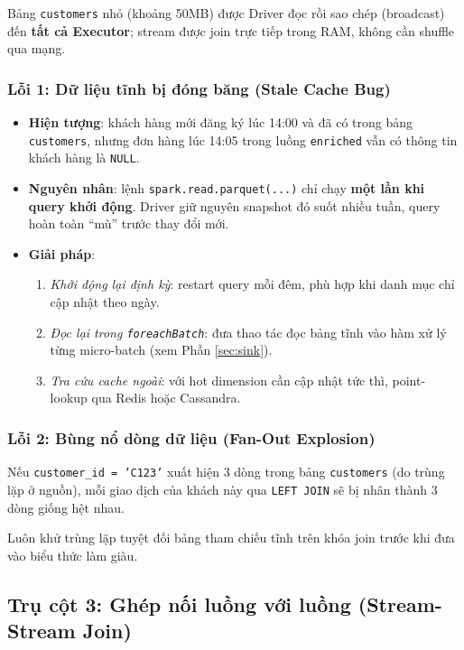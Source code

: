 \documentclass[12pt]{article}
\begin{document}
Bảng \texttt{customers} nhỏ (khoảng 50MB) được Driver đọc rồi sao chép (broadcast) đến \textbf{tất cả Executor}; stream được join trực tiếp trong RAM, không cần shuffle qua mạng.

\subsubsection{Lỗi 1: Dữ liệu tĩnh bị đóng băng (Stale Cache Bug)}

\begin{itemize}
    \item \textbf{Hiện tượng}: khách hàng mới đăng ký lúc 14:00 và đã có trong bảng \texttt{customers}, nhưng đơn hàng lúc 14:05 trong luồng \texttt{enriched} vẫn có thông tin khách hàng là \texttt{NULL}.
    \item \textbf{Nguyên nhân}: lệnh \texttt{spark.read.parquet(...)} chỉ chạy \textbf{một lần khi query khởi động}. Driver giữ nguyên snapshot đó suốt nhiều tuần, query hoàn toàn ``mù'' trước thay đổi mới.
    \item \textbf{Giải pháp}:
    \begin{enumerate}
        \item \textit{Khởi động lại định kỳ}: restart query mỗi đêm, phù hợp khi danh mục chỉ cập nhật theo ngày.
        \item \textit{Đọc lại trong \texttt{foreachBatch}}: đưa thao tác đọc bảng tĩnh vào hàm xử lý từng micro-batch (xem Phần \ref{sec:sink}).
        \item \textit{Tra cứu cache ngoài}: với hot dimension cần cập nhật tức thì, point-lookup qua Redis hoặc Cassandra.
    \end{enumerate}
\end{itemize}

\subsubsection{Lỗi 2: Bùng nổ dòng dữ liệu (Fan-Out Explosion)}

Nếu \texttt{customer\_id = 'C123'} xuất hiện 3 dòng trong bảng \texttt{customers} (do trùng lặp ở nguồn), mỗi giao dịch của khách này qua \texttt{LEFT JOIN} sẽ bị nhân thành 3 dòng giống hệt nhau.

\begin{notebox}
Luôn khử trùng lặp tuyệt đối bảng tham chiếu tĩnh trên khóa join trước khi đưa vào biểu thức làm giàu.
\end{notebox}

\subsection{Trụ cột 3: Ghép nối luồng với luồng (Stream-Stream Join)}
\end{document}
